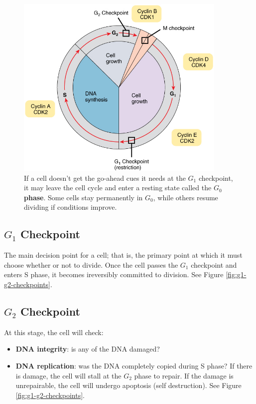 \documentclass[12pt]{report}
\begin{document}
\begin{figure}[H]
\centering
    \includegraphics[width=0.9\textwidth]{../figures/healthy cell checkpoints.jpg}
    \caption{If a cell doesn't get the go-ahead cues it needs at the $G_1$ checkpoint, it may leave the cell cycle and enter a resting state called the \textbf{ $G_0$ phase}. Some cells stay permanently in $G_0$, while others resume dividing if conditions improve.}
    \label{fig:healthy-cell-checkpoints}
\end{figure}

\subsection{$G_1$ Checkpoint}
\begin{definition}[$G_1$ Checkpoint]
    The main decision point for a cell; that is, the primary point at which it must choose whether or not to divide. Once the cell passes the $G_1$ checkpoint and enters S phase, it becomes ireversibly committed to division. See Figure \ref{fig:g1-g2-checkpoints}.
\end{definition}

\subsection{$G_2$ Checkpoint}
\begin{definition}[$G_2$ Checkpoint]
    At this stage, the cell will check: 
    \begin{itemize}
        \item{ \textbf{DNA integrity}: is any of the DNA damaged?}
        \item{ \textbf{DNA replication}: was the DNA completely copied during S phase?}
            If there is damage, the cell will stall at the $G_2$ phase to repair. If the damage is unrepairable, the cell will undergo apoptosis (self destruction). See Figure \ref{fig:g1-g2-checkpoints}.
    \end{itemize}
\end{definition}
\end{document}
